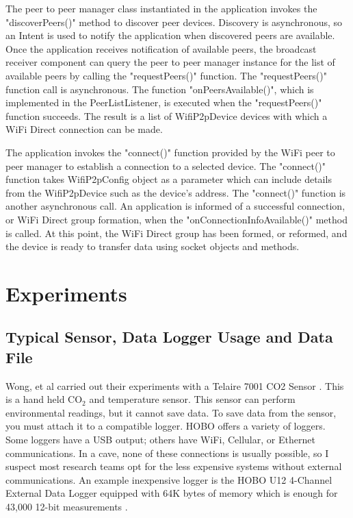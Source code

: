 \documentclass[10pt,twocolumn]{article}
\begin{document}
The peer to peer manager class instantiated in the application invokes the "discoverPeers()" method to discover peer devices.
Discovery is asynchronous, so an Intent is used to notify the application when discovered peers are available.
Once the application receives notification of available peers, the broadcast receiver component can query the peer to peer manager instance for the list of available peers by calling the "requestPeers()" function.
The "requestPeers()" function call is asynchronous.
The function "onPeersAvailable()", which is implemented in the PeerListListener, is executed when the "requestPeers()" function succeeds. 
The result is a list of WifiP2pDevice devices with which a WiFi Direct connection can be made. \cite{androidp2p}

The application invokes the "connect()" function provided by the WiFi peer to peer manager to establish a connection to a selected device.
The "connect()" function takes WifiP2pConfig object as a parameter which can include details from the WifiP2pDevice such as the device's address.
The "connect()" function is another asynchronous call. 
An application is informed of a successful connection, or WiFi Direct group formation, when the "onConnectionInfoAvailable()" method is called.
At this point, the WiFi Direct group has been formed, or reformed, and the device is ready to transfer data using socket objects and methods.

\section{Experiments}

\subsection{Typical Sensor, Data Logger Usage and Data File}
\label{sec:TypicalUsage}
Wong, et al carried out their experiments with a Telaire 7001 CO2 Sensor \cite{telaire} \cite{wong2010}. 
This is a hand held CO$_2$ and temperature sensor.
This sensor can perform environmental readings, but it cannot save data.
To save data from the sensor, you must attach it to a compatible logger.
HOBO offers a variety of loggers.
Some loggers have a USB output; others have WiFi, Cellular, or Ethernet communications.
In a cave, none of these connections is usually possible, so I suspect most research teams opt for the less expensive systems without external communications.
An example inexpensive logger is the HOBO U12 4-Channel External Data Logger equipped with 64K bytes of memory which is enough for 43,000 12-bit measurements \cite{logger}. 
\end{document}
